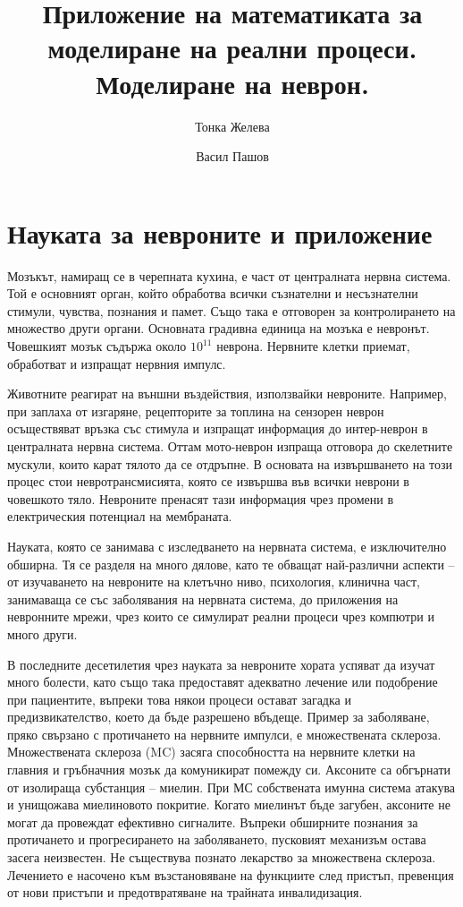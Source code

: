 \documentclass{article}
\title{Приложение на математиката за моделиране на реални процеси. Моделиране на неврон.}
\author{Тонка Желева \and Васил Пашов}
\numberwithin{equation}{section}
\begin{document}
\maketitle
\newpage

\tableofcontents
\newpage

\section{Науката за невроните и приложение}

Мозъкът, намиращ се в черепната кухина, е част от централната нервна система. Той е основният орган, който обработва всички съзнателни и
несъзнателни стимули, чувства,  познания и памет. Също така е отговорен за контролирането на множество други органи. Основната градивна
единица на мозъка е невронът. Човешкият мозък съдържа около $10^{11}$ неврона. Нервните клетки приемат, обработват и изпращат нервния импулс.

Животните реагират на външни въздействия, използвайки невроните.  Например, при заплаха от изгаряне, рецепторите за топлина на сензорен
неврон осъществяват връзка със стимула и изпращат информация до интер-неврон в централната нервна система. Оттам мото-неврон изпраща
отговора до скелетните мускули, които карат тялото да се отдръпне. В основата на извършването на този процес стои невротрансмисията, която
се извършва във всички неврони в човешкото тяло. Невроните пренасят тази информация чрез промени в електрическия потенциал на мембраната.

Науката, която се занимава с изследването на нервната система, е изключително обширна. Тя се разделя на много дялове, като те обващат
най-различни аспекти -- от изучаването на невроните на клетъчно ниво, психология, клинична част, занимаваща се със заболявания на нервната
система, до приложения на невронните мрежи, чрез които се симулират реални процеси чрез компютри и много други.

В последните десетилетия чрез науката за невроните хората успяват да изучат много болести, като също така предоставят адекватно лечение или
подобрение при пациентите, въпреки това някои процеси остават загадка и предизвикателство, което да бъде разрешено вбъдеще. Пример за
заболяване, пряко свързано с протичането на нервните импулси, е множествената склероза. Множествената склероза (MC) засяга способността на
нервните клетки на главния и гръбначния мозък да комуникират помежду си. Аксоните са обгърнати от изолираща субстанция – миелин. При МС
собствената имунна система атакува и унищожава миелиновото покритие. Когато миелинът бъде загубен, аксоните не могат да провеждат ефективно
сигналите. Въпреки обширните познания за протичането и прогресирането на заболяването, пусковият механизъм остава засега неизвестен. Не
съществува познато лекарство за множествена склероза. Лечението е насочено към възстановяване на функциите след пристъп, превенция от нови
пристъпи и предотвратяване на трайната инвалидизация.
\end{document}
